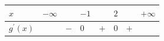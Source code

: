 \documentclass[border=.4pt]{standalone}
\begin{document}
\color{ink}\begin{tabular}{|>{\centering\arraybackslash}m{1.7cm}|>{\centering\arraybackslash}m{1.25cm}|>{\centering\arraybackslash}m{1.25cm}|>{\centering\arraybackslash}m{1.25cm}|>{\centering\arraybackslash}m{1.25cm}|>{\centering\arraybackslash}m{1.25cm}|>{\centering\arraybackslash}m{1.25cm}|>{\centering\arraybackslash}m{1.25cm}|}\hline
\cellcolor{head}$x$ & \cellcolor{head}$-\infty$ & \cellcolor{head} & \cellcolor{head}$-1$ & \cellcolor{head} & \cellcolor{head}$2$ & \cellcolor{head} & \cellcolor{head}$+\infty$ \\ \hline
\cellcolor{head}$g^{\prime}(x)$ &  & $-$ & $0$ & $+$ & $0$ & $+$ &  \\ \hline\end{tabular}
\end{document}
